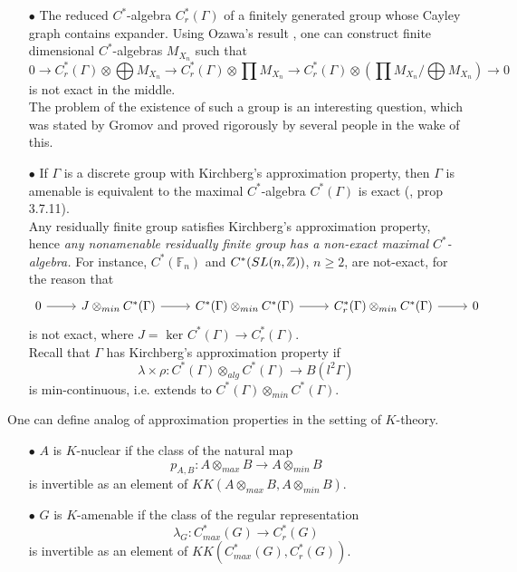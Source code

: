 \begin{itemize}
\begin{itemize}
\item[$\bullet$] The reduced $C^*$-algebra $C_r^*(\Gamma) $ of a finitely generated group whose Cayley graph contains expander. Using Ozawa's result \cite{OzawaExpander}, one can construct finite dimensional $C^*$-algebras $M_{X_n}$ such that 
\[ 0 \rightarrow C_r^*(\Gamma) \otimes \bigoplus M_{X_n} \rightarrow C_r^*(\Gamma) \otimes \prod M_{X_n} \rightarrow C_r^*(\Gamma) \otimes \left(\prod M_{X_n} /  \bigoplus M_{X_n} \right) \rightarrow 0\] is not exact in the middle.\\ The problem of the existence of such a group is an interesting question, which was stated by Gromov and proved rigorously by several people in the wake of this.\\	
\item[$\bullet$] If $\Gamma$ is a discrete group with Kirchberg's approximation property, then $\Gamma$ is amenable is equivalent to the maximal $C^*$-algebra $C^*(\Gamma)$ is exact (\cite{BrownOzawa}, prop 3.7.11). \\

Any residually finite group satisfies Kirchberg's approximation property, hence \textit{any nonamenable residually finite group has a non-exact maximal $C^*$-algebra.} For instance, $C^*(\mathbb F_n)$ and $C^*(SL(n,\mathbb Z))$, $n\geq 2$, are not-exact, for the reason that
\[\begin{tikzcd}0 \arrow{r} & J \otimes_{min} C^*(\Gamma) \arrow{r} & C^*(\Gamma) \otimes_{min} C^*(\Gamma)  \arrow{r} & C^*_r(\Gamma)\otimes_{min} C^*(\Gamma)  \arrow{r} & 0 \end{tikzcd}\]
is not exact, where $J = \text{ ker } C^*(\Gamma) \rightarrow  C_r^*(\Gamma)  $.\\

 Recall that $\Gamma$ has Kirchberg's approximation property if 
\[\lambda \times \rho : C^*(\Gamma) \otimes_{alg} C^*(\Gamma) \rightarrow B(l^2 \Gamma) \]
is min-continuous, i.e. extends to $C^*(\Gamma) \otimes_{min} C^*(\Gamma)$.\\
\end{itemize}

\end{itemize}

One can define analog of approximation properties in the setting of $K$-theory. \\

\begin{itemize}
\item[$\bullet$] $A$ is $K$-nuclear if the class of the natural map
\[ p_{A,B} : A\otimes_{max} B \rightarrow A\otimes_{min} B \]
is invertible as an element of $KK(A\otimes_{max} B,A\otimes_{min} B)$.\\
\item[$\bullet$] $G$ is $K$-amenable if the class of the regular representation
\[ \lambda_{G} : C_{max}^*(G) \rightarrow C_{r}^*(G) \]
is invertible as an element of $KK(C_{max}^*(G),C_{r}^*(G))$.\\
\end{itemize}

